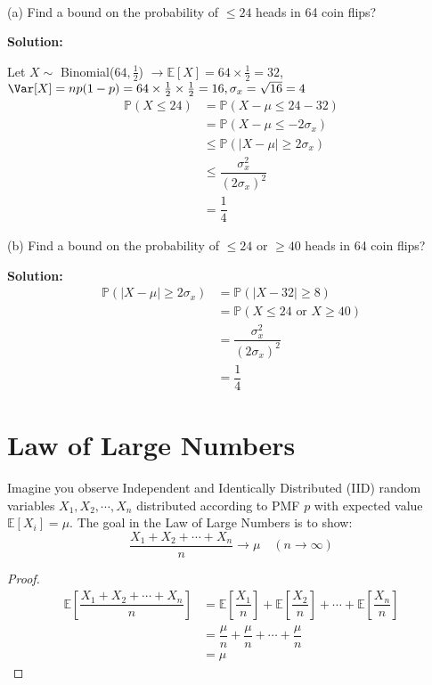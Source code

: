 \begin{eg}~ 

    (a) Find a bound on the probability of \(\leq 24\) heads in 64 coin flips?

    \textbf{Solution:} 

    Let \(X \sim\) Binomial(\(64, \frac{1}{2}\)) \(\rightarrow \mathbb{E}[X] = 64 \times \frac{1}{2} = 32\), \(\Var[X] = np(1 - p) = 64 \times \frac{1}{2} \times \frac{1}{2} = 16, \sigma_x = \sqrt{16} = 4 \) 
    \[
        \begin{aligned}
            \mathbb{P}(X \leq 24) &= \mathbb{P}(X - \mu \leq 24 - 32) \\
            &= \mathbb{P}(X - \mu \leq -2\sigma_x) \\
            &\leq \mathbb{P}(\vert X - \mu \vert \geq 2\sigma_x) \\
            &\leq \dfrac{\sigma_{x}^2}{(2\sigma_{x})^2} \\
            &= \dfrac{1}{4}
        \end{aligned}
    \]

    (b) Find a bound on the probability of \(\leq 24\) or \(\geq 40\) heads in 64 coin flips?

    \textbf{Solution:} 
    \[
        \begin{aligned}
            \mathbb{P}(\vert X - \mu \vert \geq 2\sigma_x) &= \mathbb{P}(\vert X - 32 \vert \geq 8) \\
            &= \mathbb{P}(X \leq 24 \text{ or } X \geq 40) \\
            &= \dfrac{\sigma_{x}^2}{(2\sigma_{x})^2} \\
            &= \dfrac{1}{4}
        \end{aligned}
    \]
\end{eg}

\section{Law of Large Numbers}
Imagine you observe Independent and Identically Distributed (IID)
random variables \(X_1, X_2, \cdots, X_n\) distributed according to PMF \(p\) with expected value \(\mathbb{E}[X_i] = \mu\). The goal in the Law of Large Numbers is to show:
\[
    \dfrac{X_1 + X_2 + \cdots + X_n}{n} \longrightarrow \mu \quad (n \to \infty)
\]

\begin{proof}
    \[
        \begin{aligned}
            \mathbb{E}[\dfrac{X_1 + X_2 + \cdots + X_n}{n}] &= \mathbb{E}[\dfrac{X_1}{n}] + \mathbb{E}[\dfrac{X_2}{n}] + \cdots + \mathbb{E}[\dfrac{X_n}{n}] \\
            &= \dfrac{\mu}{n} + \dfrac{\mu}{n} + \cdots + \dfrac{\mu}{n} \\
            &= \mu 
        \end{aligned}
    \]
\end{proof}


